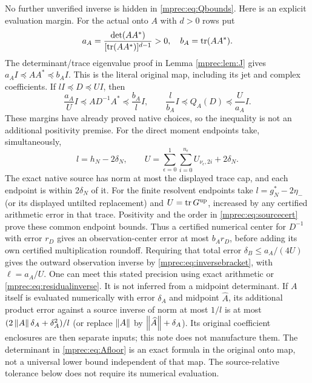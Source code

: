 \documentclass[11pt]{article}
\begin{document}
No further unverified inverse is hidden in \eqref{mprec:eq:Qbounds}.
Here is an explicit evaluation margin. For the actual onto $A$
with $d>0$ rows put
\begin{equation}\label{mprec:eq:Afloor}
 a_A=\frac{\det(AA^*)}{[\operatorname{tr}(AA^*)]^{d-1}}>0,
 \quad b_A=\operatorname{tr}(AA^*).
\end{equation}
The determinant/trace eigenvalue proof in Lemma \ref{mprec:lem:J}
gives $a_AI\preceq AA^*\preceq b_AI$. This is the literal
original map, including its jet and complex coefficients. If
$lI\preceq D\preceq UI$, then
\begin{equation}\label{mprec:eq:obsmargins}
 \frac{a_A}{U}I\preceq AD^{-1}A^*\preceq\frac{b_A}{l}I,
\qquad \frac l{b_A}I\preceq Q_A(D)\preceq\frac U{a_A}I.
\end{equation}
These margins have already proved native choices, so the
inequality is not an additional positivity premise. For the direct
moment endpoints take, simultaneously,
\[
 l=h_N-2\delta_N,\qquad
 U=\sum_{\epsilon=0}^1\sum_{i=0}^{n_\epsilon}
                 U_{\nu_\epsilon,2i}+2\delta_N.
\]
The exact native source has norm at most the displayed trace cap,
and each endpoint is within $2\delta_N$ of it. For the finite
resolvent endpoints take $l=g_N^*-2\eta_-$ (or its displayed
untilted replacement) and $U=\operatorname{tr} G^{\rm up}$, increased by any
certified arithmetic error in that trace. Positivity and the order
in \eqref{mprec:eq:sourcecert} prove these common endpoint bounds.
Thus a certified numerical center for $D^{-1}$ with error $r_D$
gives an observation-center error at most $b_Ar_D$, before adding
its own certified multiplication roundoff. Requiring that total
error $\delta_B\le a_A/(4U)$ gives the outward observation
inverse by \eqref{mprec:eq:inversebracket}, with $\ell=a_A/U$.
One can meet this stated precision using exact arithmetic or
\eqref{mprec:eq:residualinverse}. It is not inferred from a midpoint
determinant. If $A$ itself is evaluated numerically with error
$\delta_A$ and midpoint $\widehat A$, its additional product
error against a source inverse of norm at most $1/l$ is at most
$(2\left\lVert A\right\rVert\delta_A+\delta_A^2)/l$ (or replace $\left\lVert A\right\rVert$
by $\left\lVert\widehat A\right\rVert+\delta_A$). Its original coefficient
enclosures are then separate inputs; this note does not manufacture
them. The determinant in \eqref{mprec:eq:Afloor} is an exact formula
in the original onto map, not a universal lower bound independent
of that map. The source-relative tolerance below does not require
its numerical evaluation.
\end{document}

